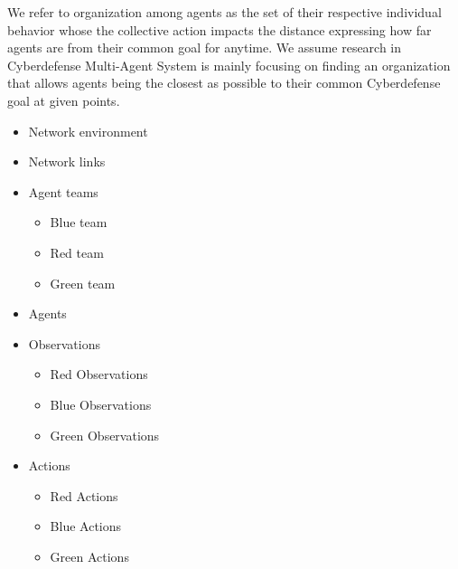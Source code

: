 \documentclass[conference]{IEEEtran}
\begin{document}
We refer to organization among agents as the set of their respective individual behavior whose the collective action impacts the distance expressing how far agents are from their common goal for anytime. We assume research in Cyberdefense Multi-Agent System is mainly focusing on finding an organization that allows agents being the closest as possible to their common Cyberdefense goal at given points.

\begin{itemize}
    \item Network environment %
    \item Network links %
    \item Agent teams %
          \begin{itemize}
              \item Blue team
              \item Red team
              \item Green team
          \end{itemize}
    \item Agents %
    \item Observations %
          \begin{itemize}
              \item Red Observations %
              \item Blue Observations %
              \item Green Observations
          \end{itemize}
    \item Actions %
          \begin{itemize}
              \item Red Actions %
              \item Blue Actions %
              \item Green Actions %
          \end{itemize}
\end{itemize}
\end{document}
